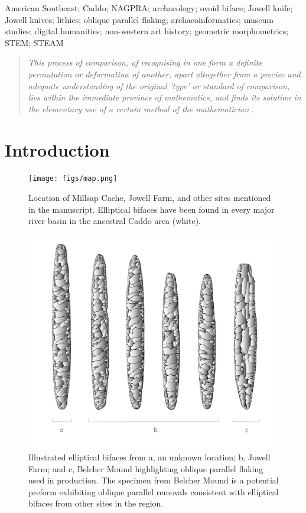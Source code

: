 \documentclass[]{interact}
\theoremstyle{plain}%
\theoremstyle{definition}
\theoremstyle{remark}
\begin{document}
\begin{keywords}
American Southeast; Caddo; NAGPRA; archaeology; ovoid biface; Jowell
knife; Jowell knives; lithics; oblique parallel flaking;
archaeoinformatics; museum studies; digital humanities; non-western art
history; geometric morphometrics; STEM; STEAM
\end{keywords}

\begin{quote}
\textit{This process of comparison, of recognising in one form a definite permutation or deformation of another, apart altogether from a precise and adequate understanding of the original 'type' or standard of comparison, lies within the immediate province of mathematics, and finds its solution in the elementary use of a certain method of the mathematician} \citep{RN7522}.
\end{quote}

\hypertarget{introduction}{%
\section{Introduction}\label{introduction}}

\begin{figure}\centering
\texttt{[image: figs/map.png]}
\caption{Location of Millsap Cache, Jowell Farm, and other sites mentioned in the manuscript. Elliptical bifaces have been found in every major river basin in the ancestral Caddo area (white).}
\label{fig:map}
\end{figure}

\begin{figure}\centering
\includegraphics[width=\linewidth]{figs/elliptical.illustration.png}
\caption{Illustrated elliptical bifaces from a, an unknown location; b, Jowell Farm; and c, Belcher Mound highlighting oblique parallel flaking used in production. The specimen from Belcher Mound is a potential preform exhibiting oblique parallel removals consistent with elliptical bifaces from other sites in the region.}
\label{fig:illustrated}
\end{figure}
\end{document}
